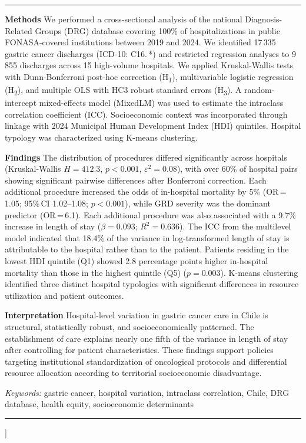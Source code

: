 \documentclass[10pt,twocolumn]{article}
\renewenvironment{abstract}
  {\small\setlength{\parindent}{0pt}\setlength{\parskip}{3pt}%
   \noindent\rule{\linewidth}{1.5pt}\vspace{4pt}\par}
  {\par\vspace{4pt}\noindent\rule{\linewidth}{0.8pt}}
\begin{document}
{\begin{@twocolumnfalse}
\begin{abstract}
\vspace{4pt}
\noindent\textbf{\textcolor{lancetgreen}{Methods}}\quad
We performed a cross-sectional analysis of the national Diagnosis-Related Groups (DRG)
database covering 100\% of hospitalizations in public FONASA-covered institutions between
2019 and 2024. We identified 17\,335 gastric cancer discharges (ICD-10: C16.\,*) and
restricted regression analyses to 9\,855 discharges across 15 high-volume hospitals.
We applied Kruskal-Wallis tests with Dunn-Bonferroni post-hoc correction (H\textsubscript{1}),
multivariable logistic regression (H\textsubscript{2}), and multiple OLS with HC3 robust
standard errors (H\textsubscript{3}). A random-intercept mixed-effects model (MixedLM) was
used to estimate the intraclass correlation coefficient (ICC). Socioeconomic context
was incorporated through linkage with 2024 Municipal Human Development Index (HDI)
quintiles. Hospital typology was characterized using K-means clustering.

\vspace{4pt}
\noindent\textbf{\textcolor{lancetgreen}{Findings}}\quad
The distribution of procedures differed significantly across hospitals (Kruskal-Wallis
$H = 412.3$, $p < 0{.}001$, $\varepsilon^2 = 0{.}08$), with over 60\% of hospital pairs
showing significant pairwise differences after Bonferroni correction. Each additional
procedure increased the odds of in-hospital mortality by 5\%
(OR\,=\,1{.}05; 95\%\,CI 1.02–1.08; $p < 0{.}001$), while GRD severity was the
dominant predictor (OR\,=\,6{.}1). Each additional procedure was also associated with
a 9{.}7\% increase in length of stay ($\beta = 0{.}093$; $R^2 = 0{.}636$). The
ICC from the multilevel model indicated that 18{.}4\% of the variance in log-transformed
length of stay is attributable to the hospital rather than to the patient. Patients
residing in the lowest HDI quintile (Q1) showed 2{.}8 percentage points higher
in-hospital mortality than those in the highest quintile (Q5) ($p = 0{.}003$).
K-means clustering identified three distinct hospital typologies with significant
differences in resource utilization and patient outcomes.

\vspace{4pt}
\noindent\textbf{\textcolor{lancetgreen}{Interpretation}}\quad
Hospital-level variation in gastric cancer care in Chile is structural, statistically
robust, and socioeconomically patterned. The establishment of care explains nearly one fifth
of the variance in length of stay after controlling for patient characteristics. These
findings support policies targeting institutional standardization of oncological protocols
and differential resource allocation according to territorial socioeconomic disadvantage.

\vspace{6pt}
{\fontsize{8}{10}\selectfont
\textit{Keywords:} gastric cancer, hospital variation, intraclass correlation, Chile,
DRG database, health equity, socioeconomic determinants\par}
\end{abstract}

\vspace{10pt}
\end{@twocolumnfalse}
}]
\end{document}
